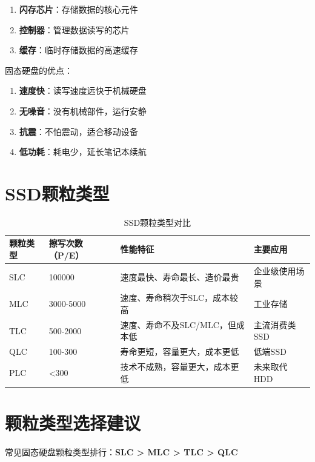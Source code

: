 \documentclass[12pt,UTF8]{ctexbook}
\begin{document}
\begin{enumerate}
    \item \textbf{闪存芯片}：存储数据的核心元件
    \item \textbf{控制器}：管理数据读写的芯片
    \item \textbf{缓存}：临时存储数据的高速缓存
\end{enumerate}

固态硬盘的优点：
\begin{enumerate}
    \item \textbf{速度快}：读写速度远快于机械硬盘
    \item \textbf{无噪音}：没有机械部件，运行安静
    \item \textbf{抗震}：不怕震动，适合移动设备
    \item \textbf{低功耗}：耗电少，延长笔记本续航
\end{enumerate}

\section{SSD颗粒类型}

\begin{table}[H]
    \centering
    \begin{tabular}{|p{2cm}|p{2cm}|p{4cm}|p{4cm}|}
        \hline
        \textbf{颗粒类型} & \textbf{擦写次数（P/E）} & \textbf{性能特征} & \textbf{主要应用} \\
        \hline
        SLC & 100000 & 速度最快、寿命最长、造价最贵 & 企业级使用场景 \\
        \hline
        MLC & 3000-5000 & 速度、寿命稍次于SLC，成本较高 & 工业存储 \\
        \hline
        TLC & 500-2000 & 速度、寿命不及SLC/MLC，但成本低 & 主流消费类SSD \\
        \hline
        QLC & 100-300 & 寿命更短，容量更大，成本更低 & 低端SSD \\
        \hline
        PLC & <300 & 技术不成熟，容量更大，成本更低 & 未来取代HDD \\
        \hline
    \end{tabular}
    \caption{SSD颗粒类型对比}
    \label{tab:ssd_nand_types}
\end{table}

\section{颗粒类型选择建议}

常见固态硬盘颗粒类型排行：\textbf{SLC > MLC > TLC > QLC}
\end{document}
